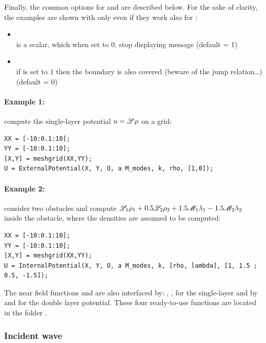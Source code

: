 Finally, the common options for \ExternalPotential and \InternalPotential are described below. For the sake of clarity, the examples are shown with only \ExternalPotential even if they work also for \InternalPotential:
\begin{itemize}
\item {}\\
 is a scalar, which when set to 0, stop displaying message (default = 1)
\item {}\\
if  is set to $1$ then the boundary is also covered (beware of the jump relation\ldots) (default = 0)
\end{itemize}

\paragraph{Example 1: }compute the single-layer potential $u={\mathscr L}\rho$ on a grid:
\begin{lstlisting}
XX = [-10:0.1:10];
YY = [-10:0.1:10];
[X,Y] = meshgrid(XX,YY);
U = ExternalPotential(X, Y, O, a M_modes, k, rho, [1,0]);
\end{lstlisting}

\paragraph{Example 2: } consider two obstacles and compute ${\mathscr L}_1\rho_1 + 0.5{\mathscr L}_2\rho_2 + 1.5{\mathscr M}_1\lambda_1 -1.5{\mathscr M}_2\lambda_2$  inside the obstacle, where the densities are assumed to be computed:
\begin{lstlisting}
XX = [-10:0.1:10];
YY = [-10:0.1:10];
[X,Y] = meshgrid(XX,YY);
U = InternalPotential(X, Y, O, a M_modes, k, [rho, lambda], [1, 1.5 ; 0.5, -1.5]);
\end{lstlisting}

\begin{remark}
The near field functions \ExternalPotential and \InternalPotential are also interfaced by: \ExternalSingleLayerPotential, \InternalSingleLayerPotential, for the single-layer and by \ExternalDoubleLayerPotential and \InternalDoubleLayerPotential for the double layer potential. These four ready-to-use functions are located in the folder .
\end{remark}

\subsubsection{Incident wave}
\label{secFun:IncidentWaveOnGrid}

